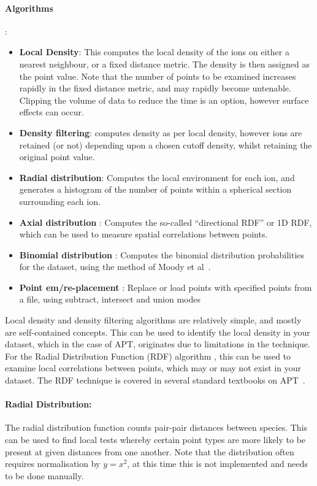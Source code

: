 \documentclass[10pt]{article}
\begin{document}
\paragraph{Algorithms}:
\begin{itemize}
\item \textbf{Local Density}: This computes the local density of the ions on either a nearest neighbour, or a fixed distance metric. The density is then assigned as the point value. Note that the number of points to be examined increases rapidly in the fixed distance metric, and may rapidly become untenable. Clipping the volume of data to reduce the time is an option, however surface effects can occur.
\item \textbf{Density filtering}: computes density as per local density, however ions are retained (or not) depending upon a chosen cutoff density,  whilst retaining the original point value.
\item \textbf{Radial distribution}: Computes the local environment for each ion, and generates a histogram of the number of points within a spherical section surrounding each ion. 
\item \textbf{Axial distribution} : Computes the so-called ``directional RDF'' or 1D RDF, which can be used to measure spatial correlations between points. 
\item \textbf{Binomial distribution} : Computes the binomial distribution probabilities for the dataset, using the method of Moody et al~\cite{Moody2008}.
\item \textbf{Point em/re-placement} : Replace or load points with specified points from a file, using subtract, intersect and union modes
\end{itemize}

Local density and density filtering algorithms are relatively simple, and mostly are self-contained concepts. This can be used to identify the local density in your dataset, which in the case of APT, originates due to limitations in the technique. For the Radial Distribution Function (RDF) algorithm , this can be used to examine local correlations between points, which may or may not exist in your dataset. The  RDF technique is covered in several standard textbooks on APT~\cite{Gault2012}. 

\paragraph{Radial Distribution:} The radial distribution function counts pair-pair distances between species. This can be used to find local tests whereby certain point types are more likely to be  present at given distances from one another. Note that the distribution often requires normalisation by $y=x^2$, at this time this is not implemented and needs to be done manually.
\end{document}
